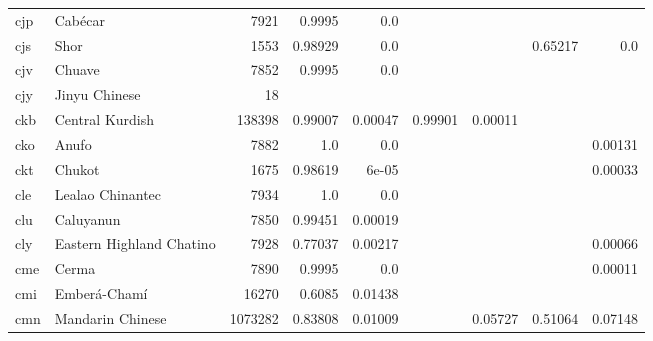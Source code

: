 \documentclass[11pt]{article}
\begin{document}
\begin{table*}[h]
{\begin{tabular}{llrrrrrrr}
cjp         & Cabécar         & 7921         & 0.9995         & 0.0         &          &          &          &          \\

cjs         & Shor         & 1553         & 0.98929         & 0.0         &          &          & 0.65217         & 0.0         \\

cjv         & Chuave         & 7852         & 0.9995         & 0.0         &          &          &          &          \\

cjy         & Jinyu Chinese         & 18         &          &          &          &          &          &          \\

ckb         & Central Kurdish         & 138398         & 0.99007         & 0.00047         & 0.99901         & 0.00011         &          &          \\

cko         & Anufo         & 7882         & 1.0         & 0.0         &          &          &          & 0.00131         \\

ckt         & Chukot         & 1675         & 0.98619         & 6e-05         &          &          &          & 0.00033         \\

cle         & Lealao Chinantec         & 7934         & 1.0         & 0.0         &          &          &          &          \\

clu         & Caluyanun         & 7850         & 0.99451         & 0.00019         &          &          &          &          \\

cly         & Eastern Highland Chatino         & 7928         & 0.77037         & 0.00217         &          &          &          & 0.00066         \\

cme         & Cerma         & 7890         & 0.9995         & 0.0         &          &          &          & 0.00011         \\

cmi         & Emberá-Chamí         & 16270         & 0.6085         & 0.01438         &          &          &          &          \\

cmn         & Mandarin Chinese         & 1073282         & 0.83808         & 0.01009         &          & 0.05727         & 0.51064         & 0.07148         \\


\end{tabular}}
\end{table*}
\end{document}
